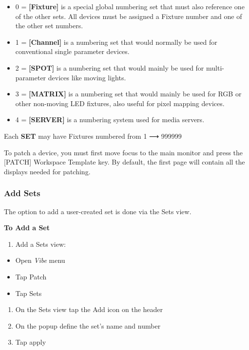 \documentclass[
]{article}
\providecommand{\tightlist}{%
  \setlength{\itemsep}{0pt}\setlength{\parskip}{0pt}}
\begin{document}
\begin{itemize}
\item
  0 = \textbf{{[}Fixture{]}} is a special global numbering set that must also reference one of the other sets. All devices must be assigned a Fixture number and one of the other set numbers.
\item
  1 = \textbf{{[}Channel{]}} is a numbering set that would normally be used for conventional single parameter devices.
\item
  2 = \textbf{{[}SPOT{]}} is a numbering set that would mainly be used for multi-parameter devices like moving lights.
\item
  3 = \textbf{{[}MATRIX{]}} is a numbering set that would mainly be used for RGB or other non-moving LED fixtures, also useful for pixel mapping devices.
\item
  4 = \textbf{{[}SERVER{]}} is a numbering system used for media servers.
\end{itemize}

Each \textbf{SET} may have Fixtures numbered from 1 ⟶ 999999

To patch a device, you must first move focus to the main monitor and press the {[}PATCH{]} Workspace Template key. By default, the first page will contain all the displays needed for patching.

\hypertarget{add-sets}{%
\subsubsection{Add Sets}\label{add-sets}}

The option to add a user-created set is done via the Sets view.

\textbf{To Add a Set}

\begin{enumerate}
\def\labelenumi{\arabic{enumi}.}
\tightlist
\item
  Add a Sets view:
\end{enumerate}

\begin{itemize}
\item
  Open \emph{Vibe} menu
\item
  Tap Patch
\item
  Tap Sets
\end{itemize}

\begin{enumerate}
\def\labelenumi{\arabic{enumi}.}
\setcounter{enumi}{1}
\item
  On the Sets view tap the Add icon on the header
\item
  On the popup define the set's name and number
\item
  Tap apply
\end{enumerate}
\end{document}
